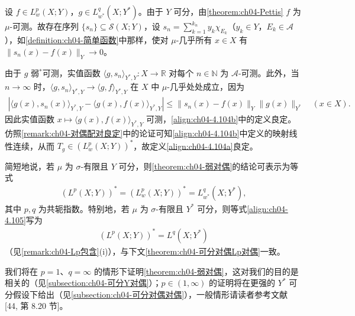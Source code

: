 \documentclass[../../main.tex]{subfiles}%
\begin{document}
\begin{remark}\label{remark:ch04-弱对偶良定}
设 $f\in L^p_w(X;Y)$，$g\in L^q_{w^*}(X;Y^*)$。由于 $Y$ 可分，由\cref{theorem:ch04-Pettis} $f$ 为 $\mu$-可测。故存在序列 $\{s_n\}\subseteq\mathcal{S}(X;Y)$，设 $s_n=\sum_{k=1}^{k_n}y_k\chi_{E_k}$（$y_k\in Y$，$E_k\in\mathcal{A}$），如\cref{definition:ch04-简单函数}中那样，使对 $\mu$-几乎所有 $x\in X$ 有 $\|s_n(x)-f(x)\|_Y\to0$。

由于 $g$ 弱$^*$可测，实值函数 $\langle g,s_n\rangle_{Y^*,Y}:X\to\mathbb{R}$ 对每个 $n\in\mathbb{N}$ 为 $\mathcal{A}$-可测。此外，当 $n\to\infty$ 时，$\langle g,s_n\rangle_{Y^*,Y}\to\langle g,f\rangle_{Y^*,Y}$ 在 $X$ 中 $\mu$-几乎处处成立，因为
\begin{align*}
|\langle g(x),s_n(x)\rangle_{Y^*,Y}-\langle g(x),f(x)\rangle_{Y^*,Y}|\leqslant\|s_n(x)-f(x)\|_Y\|g(x)\|_{Y^*}\quad(x\in X).
\end{align*}
因此实值函数 $x\mapsto\langle g(x),f(x)\rangle_{Y^*,Y}$ 可测，\eqref{align:ch04-4.104b}中的定义良定。仿照\cref{remark:ch04-对偶配对良定}中的论证可知\eqref{align:ch04-4.104b}中定义的映射线性连续，从而 $T_g\in(L^p_w(X;Y))^*$，故定义\eqref{align:ch04-4.104a}良定。
\end{remark}

简短地说，若 $\mu$ 为 $\sigma$-有限且 $Y$ 可分，则\cref{theorem:ch04-弱对偶}的结论可表示为等式
\begin{align}
(L^p(X;Y))^*=(L^p_w(X;Y))^*=L^q_{w^*}(X;Y^*), \label{align:ch04-4.105}
\end{align}
其中 $p,q$ 为共轭指数。特别地，若 $\mu$ 为 $\sigma$-有限且 $Y^*$ 可分，则等式\eqref{align:ch04-4.105}写为
\begin{align}
(L^p(X;Y))^*=L^q(X;Y^*) \label{align:ch04-4.106}
\end{align}
（见\cref{remark:ch04-Lp包含}(i)），与下文\cref{theorem:ch04-可分对偶Lp对偶}一致。

我们将在 $p=1$、$q=\infty$ 的情形下证明\cref{theorem:ch04-弱对偶}，这对我们的目的是相关的（见\cref{subsection:ch04-可分Y对偶}）；$p\in(1,\infty)$ 的证明将在更强的 $Y^*$ 可分假设下给出（见\cref{subsection:ch04-可分对偶对偶}），一般情形请读者参考文献 [44, 第 8.20 节]。
\end{document}

